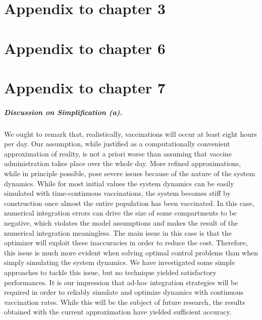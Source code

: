 \renewcommand{\thefigure}{\textsc{s}\arabic{figure}}
\renewcommand{\theequation}{\textsc{s}\arabic{equation}}
\setcounter{figure}{0}
\setcounter{equation}{0}

\chapter{Appendix to chapter 3}

\chapter{Appendix to chapter 6}

\chapter{Appendix to chapter 7}



\paragraph{Discussion on Simplification (a).}
We ought to remark that, realistically, vaccinations will occur at least eight hours per day. Our assumption, while justified as a computationally convenient approximation of reality, is not a priori worse than assuming that vaccine administration takes place over the whole day. More refined approximations, while in principle possible, pose severe issues because of the nature of the system dynamics. While for most initial values the system dynamics can be easily simulated with time-continuous vaccinations, the system becomes stiff by construction once almost the entire population has been vaccinated. In this case, numerical integration errors can drive the size of some compartments to be negative, which violates the model assumptions and makes the result of the numerical integration meaningless. The main issue in this case is that the optimizer will exploit these inaccuracies in order to reduce the cost. Therefore, this issue is much more evident when solving optimal control problems than when simply simulating the system dynamics. We have investigated some simple approaches to tackle this issue, but no technique yielded satisfactory performances. It is our impression that ad-hoc integration strategies will be required in order to reliably simulate and optimize dynamics with continuous vaccination rates. While this will be the subject of future research, the results obtained with the current approximation have yielded sufficient accuracy.

